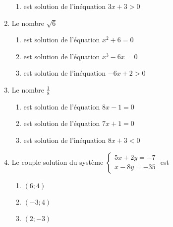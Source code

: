 \documentclass[oneside,twoside]{book}
\begin{document}
\begin{enumerate}
\begin{enumerate}
\item\BonneReponse est solution de l'inéquation $3x+3>0$

\end{enumerate}



\item Le nombre $\sqrt{6}$

\begin{enumerate}

\item\MauvaiseReponse est solution de l'équation $x^{2}+6=0$

\item\BonneReponse est solution de l'équation $x^{3}-6x=0$

\item\MauvaiseReponse est solution de l'inéquation $-6x+2>0$

\end{enumerate}

\newpage

\item Le nombre $\frac{1}{8}$

\begin{enumerate}

\item\BonneReponse est solution de l'équation $8x-1=0$

\item\MauvaiseReponse est solution de l'équation $7x+1=0$


\item\MauvaiseReponse est solution de l'inéquation $8x+3<0$

\end{enumerate}



\item Le couple solution du système $\left\{\begin{array}{c}5x+2y=-7 \\ x-8y=-35\end{array}\right.$ est

\begin{enumerate}

\item\MauvaiseReponse $(6;4)$

\item\BonneReponse $(-3 ;4)$

\item\MauvaiseReponse $(2 ; -3)$


\end{enumerate}




\end{enumerate}
\end{document}
